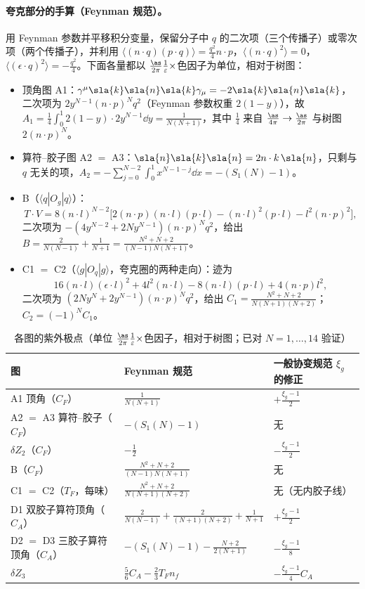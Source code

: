 \paragraph{夸克部分的手算（Feynman 规范）。}
用 Feynman 参数并平移积分变量，保留分子中 $q$ 的二次项（三个传播子）或零次项（两个传播子），并利用
$\langle(n\cdot q)(p\cdot q)\rangle=\frac{q^2}{4}n\cdot p$，$\langle(n\cdot q)^2\rangle=0$，$\langle(\epsilon\cdot q)^2\rangle=-\frac{q^2}{4}$。下面各量都以 $\frac{\as}{2\pi}\frac1\varepsilon\times$色因子为单位，相对于树图：
\begin{itemize}[leftmargin=2em]
\item 顶角图 A1：$\gamma^\mu\sla{k}\sla{n}\sla{k}\gamma_\mu=-2\sla{k}\sla{n}\sla{k}$，二次项为 $2y^{N-1}(n\cdot p)^Nq^2$（Feynman 参数权重 $2(1-y)$），故
      $A_1=\frac14\int_0^1 2(1-y)\cdot2y^{N-1}\dd y=\frac{1}{N(N+1)}$，其中 $\frac14$ 来自 $\frac{\as}{4\pi}\to\frac{\as}{2\pi}$ 与树图 $2(n\cdot p)^N$。
\item 算符–胶子图 A2 $=$ A3：$\sla{n}\sla{k}\sla{n}=2n\cdot k\,\sla{n}$，只剩与 $q$ 无关的项，$A_2=-\sum_{j=0}^{N-2}\int_0^1x^{N-1-j}\dd x=-(S_1(N)-1)$。
\item B（$\langle q|O_g|q\rangle$）：
      \[T\cdot V=8(n\cdot l)^{N-2}\big[2(n\cdot p)(n\cdot l)(p\cdot l)-(n\cdot l)^2(p\cdot l)-l^2(n\cdot p)^2\big],\]
      二次项为 $-(4y^{N-2}+2Ny^{N-1})(n\cdot p)^Nq^2$，给出 $B=\frac{2}{N(N-1)}+\frac{1}{N+1}=\frac{N^2+N+2}{(N-1)N(N+1)}$。
\item C1 $=$ C2（$\langle g|O_q|g\rangle$，夸克圈的两种走向）：迹为
      \[16(n\cdot l)(\epsilon\cdot l)^2+4l^2(n\cdot l)-8(n\cdot l)(p\cdot l)+4(n\cdot p)l^2,\]
      二次项为
      $(2Ny^N+2y^{N-1})(n\cdot p)^Nq^2$，给出 $C_1=\frac{N^2+N+2}{N(N+1)(N+2)}$；$C_2=(-1)^NC_1$。
\end{itemize}

\begin{table}[htbp]
\centering
\caption{各图的紫外极点（单位 $\frac{\as}{2\pi}\frac1\varepsilon\times$色因子，相对于树图；已对 $N=1,\dots,14$ 验证）}\label{tab:cpdf-diagrams}
\renewcommand{\arraystretch}{1.25}\small
\begin{tabular}{@{}lll@{}}
\toprule
图 & Feynman 规范 & 一般协变规范 $\xi_g$ 的修正\\
\midrule
A1 顶角（$C_F$） & $\frac{1}{N(N+1)}$ & $+\frac{\xi_g-1}{2}$\\
A2 $=$ A3 算符–胶子（$C_F$） & $-(S_1(N)-1)$ & 无\\
$\delta Z_2$（$C_F$） & $-\frac12$ & $-\frac{\xi_g-1}{2}$\\
B（$C_F$） & $\frac{N^2+N+2}{(N-1)N(N+1)}$ & 无\\
C1 $=$ C2（$T_F$，每味） & $\frac{N^2+N+2}{N(N+1)(N+2)}$ & 无（无内胶子线）\\
D1 双胶子算符顶角（$C_A$） & $\frac{2}{N(N-1)}+\frac{2}{(N+1)(N+2)}+\frac{1}{N+1}$ & $+\frac{\xi_g-1}{2}$\\
D2 $=$ D3 三胶子算符顶角（$C_A$） & $-(S_1(N)-1)-\frac{N+2}{2(N+1)}$ & $-\frac{\xi_g-1}{8}$\\
$\delta Z_3$ & $\frac56C_A-\frac23T_Fn_f$ & $-\frac{\xi_g-1}{4}C_A$\\
\bottomrule
\end{tabular}
\end{table}


